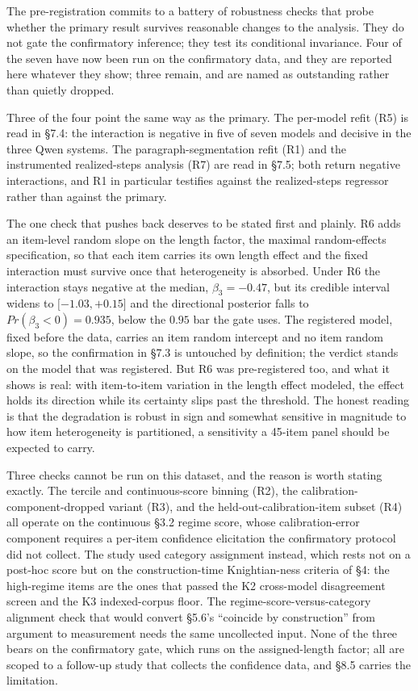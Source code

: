 \documentclass{article}
\begin{document}
The pre-registration commits to a battery of robustness checks that
probe whether the primary result survives reasonable changes to the
analysis. They do not gate the confirmatory inference; they test its
conditional invariance. Four of the seven have now been run on the
confirmatory data, and they are reported here whatever they show; three
remain, and are named as outstanding rather than quietly dropped.

Three of the four point the same way as the primary. The per-model refit
(R5) is read in \S{}7.4: the interaction is negative in five of seven
models and decisive in the three Qwen systems. The
paragraph-segmentation refit (R1) and the instrumented realized-steps
analysis (R7) are read in \S{}7.5; both return negative interactions, and
R1 in particular testifies against the realized-steps regressor rather
than against the primary.

The one check that pushes back deserves to be stated first and plainly.
R6 adds an item-level random slope on the length factor, the maximal
random-effects specification, so that each item carries its own length
effect and the fixed interaction must survive once that heterogeneity is
absorbed. Under R6 the interaction stays negative at the median,
\(\beta_{3} = - 0.47\), but its credible interval widens to
\(\lbrack - 1.03, + 0.15\rbrack\) and the directional posterior falls to
\(Pr(\beta_{3} < 0) = 0.935\), below the \(0.95\) bar the gate uses. The
registered model, fixed before the data, carries an item random
intercept and no item random slope, so the confirmation in \S{}7.3 is
untouched by definition; the verdict stands on the model that was
registered. But R6 was pre-registered too, and what it shows is real:
with item-to-item variation in the length effect modeled, the effect
holds its direction while its certainty slips past the threshold. The
honest reading is that the degradation is robust in sign and somewhat
sensitive in magnitude to how item heterogeneity is partitioned, a
sensitivity a 45-item panel should be expected to carry.

Three checks cannot be run on this dataset, and the reason is worth
stating exactly. The tercile and continuous-score binning (R2), the
calibration-component-dropped variant (R3), and the
held-out-calibration-item subset (R4) all operate on the continuous \S{}3.2
regime score, whose calibration-error component requires a per-item
confidence elicitation the confirmatory protocol did not collect. The
study used category assignment instead, which rests not on a post-hoc
score but on the construction-time Knightian-ness criteria of \S{}4: the
high-regime items are the ones that passed the K2 cross-model
disagreement screen and the K3 indexed-corpus floor. The
regime-score-versus-category alignment check that would convert \S{}5.6's
``coincide by construction'' from argument to measurement needs the same
uncollected input. None of the three bears on the confirmatory gate,
which runs on the assigned-length factor; all are scoped to a follow-up
study that collects the confidence data, and \S{}8.5 carries the
limitation.
\end{document}
